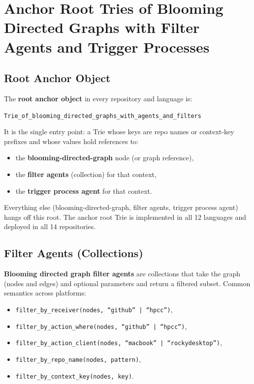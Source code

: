 \chapter{Anchor Root Tries of Blooming Directed Graphs with Filter Agents and Trigger Processes}
\label{ch:anchor-root-tries-filter-trigger}

\section{Root Anchor Object}

The \textbf{root anchor object} in every repository and language is:

\begin{center}
\texttt{Trie\_of\_blooming\_directed\_graphs\_with\_agents\_and\_filters}
\end{center}

It is the single entry point: a Trie whose keys are repo names or context-key prefixes and whose values hold references to:

\begin{itemize}
    \item the \textbf{blooming-directed-graph} node (or graph reference),
    \item the \textbf{filter agents} (collection) for that context,
    \item the \textbf{trigger process agent} for that context.
\end{itemize}

Everything else (blooming-directed-graph, filter agents, trigger process agent) hangs off this root. The anchor root Trie is implemented in all 12 languages and deployed in all 14 repositories.

\section{Filter Agents (Collections)}

\textbf{Blooming directed graph filter agents} are collections that take the graph (nodes and edges) and optional parameters and return a filtered subset. Common semantics across platforms:

\begin{itemize}
    \item \texttt{filter\_by\_receiver(nodes, ``github'' | ``hpcc'')},
    \item \texttt{filter\_by\_action\_where(nodes, ``github'' | ``hpcc'')},
    \item \texttt{filter\_by\_action\_client(nodes, ``macbook'' | ``rockydesktop'')},
    \item \texttt{filter\_by\_repo\_name(nodes, pattern)},
    \item \texttt{filter\_by\_context\_key(nodes, key)}.
\end{itemize}

